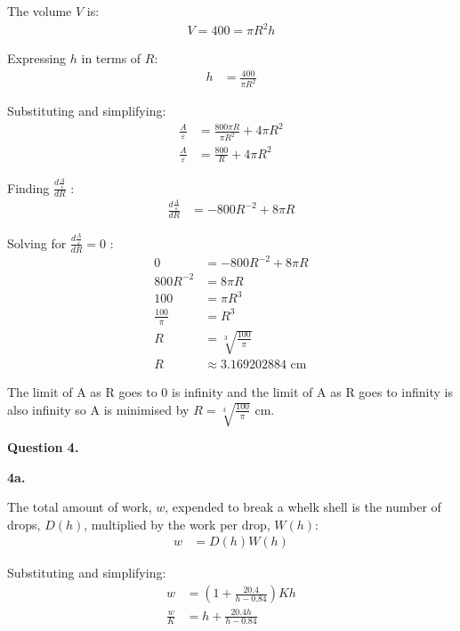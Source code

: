 \documentclass[12pt,a4paper]{report}
\begin{document}
The volume \(V\) is:
\begingroup
\addtolength{\jot}{0.5em}
\begin{align}
V = 400 = \pi R^2 h
\end{align}
\endgroup

Expressing \(h\) in terms of \(R\):
\begingroup
\addtolength{\jot}{0.5em}
\begin{align}
h &= \frac{400}{\pi R^2}
\end{align}
\endgroup

Substituting and simplifying:
\begingroup
\addtolength{\jot}{0.5em}
\begin{align}
\frac{A}{\varepsilon} &= \frac{800\pi R}{\pi R^2} + 4\pi R^2 \\
\frac{A}{\varepsilon} &= \frac{800}{R} + 4\pi R^2
\end{align}
\endgroup

Finding \(\frac{d \frac{A}{\varepsilon} } {dR} \) :
\begingroup
\addtolength{\jot}{0.5em}
\begin{align}
\frac{d \frac{A}{\varepsilon} } {dR} &= -800 R ^{-2} + 8 \pi R
\end{align}
\endgroup

Solving for  \(\frac{d \frac{A}{\varepsilon} } {dR} = 0 \) :
\begingroup
\addtolength{\jot}{0.5em}
\begin{align}
0 &= -800 R ^{-2} + 8 \pi R \\
800R^{-2} &= 8 \pi R \\
100 &= \pi R^3 \\
\frac{100}{\pi} &= R^3 \\
R &= \sqrt[3] { \frac{100}{\pi}  } \\
R &\approx 3.169202884 \text{ cm}
\end{align}
\endgroup

The limit of A as R goes to 0 is infinity and the limit of A as R goes to infinity is also infinity so A is minimised by \(R= \sqrt[3] { \frac{100}{\pi}  }\) cm.


\textbf{Question 4.}

\textbf{4a.}

The total amount of work, \(w\), expended to break a whelk shell is the number of drops, \(D(h)\), multiplied by the work per drop, \(W(h)\):
\begingroup
\addtolength{\jot}{0.5em}
\begin{align}
w &= D(h) W(h)\end{align}
\endgroup

Substituting and simplifying:
\begingroup
\addtolength{\jot}{0.5em}
\begin{align}
w &= (1 + \frac{20.4}{h-0.84}) Kh \\
\frac{w}{K} &= h + \frac{20.4h}{h-0.84} 
\end{align}
\endgroup
\end{document}
